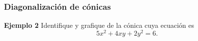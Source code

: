 
\subsection{}

\begin{frame}\frametitle{Diagonalización de cónicas}
	
	\begin{ej}{\textbf{Ejemplo 2}} \justifying
		Identifique y grafique de la cónica cuya ecuación es
		\[
			5x^2 + 4xy + 2y^2 = 6.
		\]
	\end{ej}
	
\end{frame}



\subsection{}

